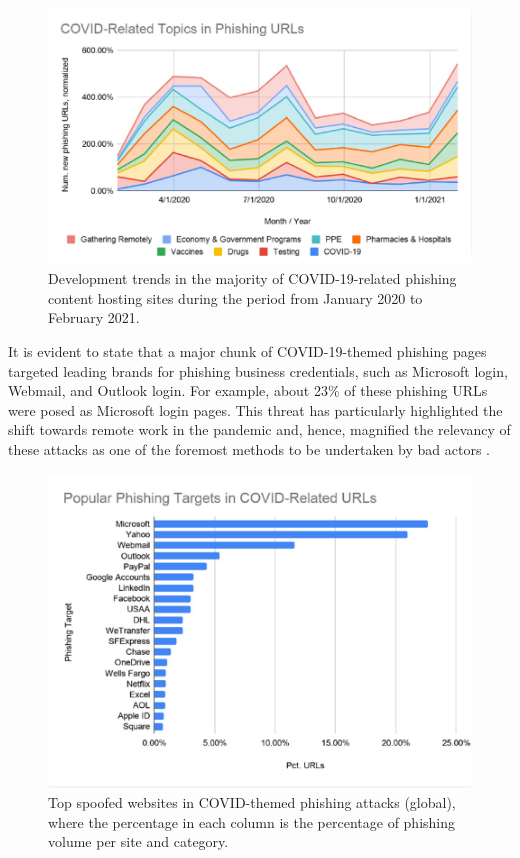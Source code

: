 \captionsetup{font= footnotesize}
\begin{figure}[H]
    \centering
    \includegraphics[width=0.8\linewidth]{background/CovidPhising.png}
    \caption{Development trends in the majority of COVID-19-related phishing content hosting sites during the period from January 2020 to February 2021.}
    \label{fig:figFourteen}
\end{figure}

It is evident to state that a major chunk of COVID-19-themed phishing pages targeted leading brands for phishing business credentials, such as Microsoft login, Webmail, and Outlook login. For example, about 23\% of these phishing URLs were posed as Microsoft login pages. This threat has particularly highlighted the shift towards remote work in the pandemic and, hence, magnified the relevancy of these attacks as one of the foremost methods to be undertaken by bad actors .


\captionsetup{font= footnotesize}
\begin{figure}[H]
    \centering
    \includegraphics[width=0.8\linewidth]{background/TOPCOVIDURLS.png}
    \caption{Top spoofed websites in COVID-themed phishing attacks (global), where the percentage in each column is the percentage of phishing volume per site and category. }
    \label{fig:figFiveteen}
\end{figure}

